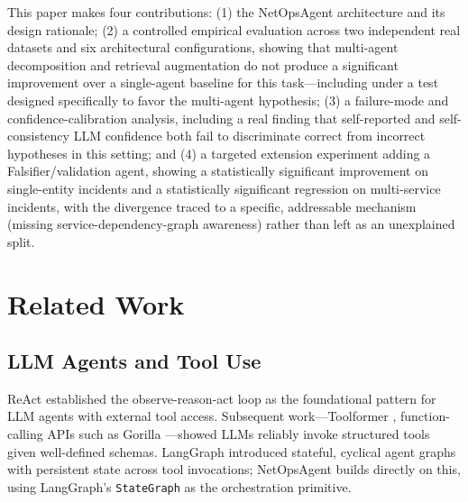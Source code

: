 \documentclass[10pt,conference]{IEEEtran}
\begin{document}
This paper makes four contributions: (1) the NetOpsAgent architecture and its
design rationale; (2) a controlled empirical evaluation across two independent
real datasets and six architectural configurations, showing that multi-agent
decomposition and retrieval augmentation do not produce a significant
improvement over a single-agent baseline for this task---including under a
test designed specifically to favor the multi-agent hypothesis; (3) a
failure-mode and confidence-calibration analysis, including a real finding
that self-reported and self-consistency LLM confidence both fail to
discriminate correct from incorrect hypotheses in this setting; and (4) a
targeted extension experiment adding a Falsifier/validation agent, showing a
statistically significant improvement on single-entity incidents and a
statistically significant regression on multi-service incidents, with the
divergence traced to a specific, addressable mechanism (missing
service-dependency-graph awareness) rather than left as an unexplained split.

\section{Related Work}
\label{sec:related}

\subsection{LLM Agents and Tool Use}
ReAct \cite{yao2023react} established the observe-reason-act loop as the
foundational pattern for LLM agents with external tool access. Subsequent
work---Toolformer \cite{schick2023toolformer}, function-calling APIs such as
Gorilla \cite{patil2023gorilla}---showed LLMs reliably invoke structured
tools given well-defined schemas. LangGraph \cite{langgraph2024} introduced
stateful, cyclical agent graphs with persistent state across tool
invocations; NetOpsAgent builds directly on this, using LangGraph's
\texttt{StateGraph} as the orchestration primitive.
\end{document}
